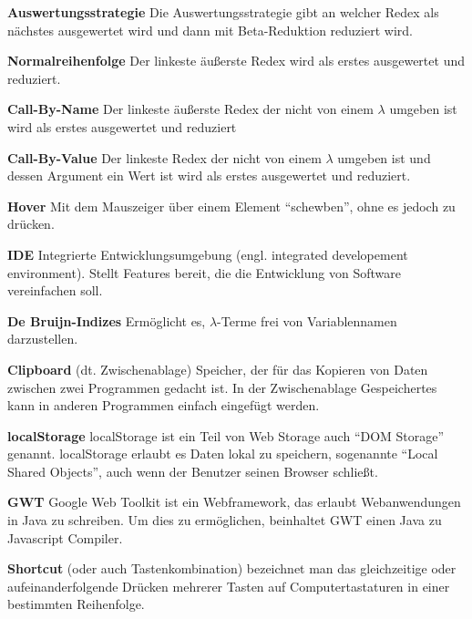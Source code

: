 \documentclass[parskip=full,11pt,twoside]{scrartcl}
\begin{document}
\textbf{Auswertungsstrategie}
\newline
Die Auswertungsstrategie gibt an welcher Redex als nächstes ausgewertet wird und dann mit Beta-Reduktion reduziert wird.

\textbf{Normalreihenfolge}
\newline
Der linkeste äußerste Redex wird als erstes ausgewertet und reduziert.

\textbf{Call-By-Name}
\newline
Der linkeste äußerste Redex der nicht von einem $\lambda$ umgeben ist wird als erstes ausgewertet und reduziert

\textbf{Call-By-Value}
\newline
Der linkeste Redex der nicht von einem $\lambda$ umgeben ist und dessen Argument ein Wert ist wird als erstes ausgewertet und reduziert.

\textbf{Hover}
\newline
Mit dem Mauszeiger über einem Element \enquote{schewben}, ohne es jedoch zu drücken.

\textbf{IDE}
\newline
Integrierte Entwicklungsumgebung (engl. integrated developement environment). Stellt Features bereit, die die Entwicklung von Software vereinfachen soll.

\textbf{De Bruijn-Indizes}
\newline
Ermöglicht es, $\lambda$-Terme frei von Variablennamen darzustellen.

\textbf{Clipboard}
\newline
(dt. Zwischenablage) Speicher, der für das Kopieren von Daten zwischen zwei Programmen gedacht ist. In der Zwischenablage Gespeichertes kann in anderen Programmen einfach eingefügt werden.

\textbf{localStorage}
\newline
localStorage ist ein Teil von Web Storage auch \enquote{DOM Storage} genannt. localStorage erlaubt es Daten lokal zu speichern, sogenannte \enquote{Local Shared Objects}, auch wenn der Benutzer seinen Browser schließt.

\textbf{GWT}
\newline
Google Web Toolkit ist ein Webframework, das erlaubt Webanwendungen in Java zu schreiben. Um dies zu ermöglichen, beinhaltet GWT einen Java zu Javascript Compiler.

\textbf{Shortcut}
\newline
(oder auch Tastenkombination) bezeichnet man das gleichzeitige oder aufeinanderfolgende Drücken mehrerer Tasten auf Computertastaturen in einer bestimmten Reihenfolge.
\end{document}
